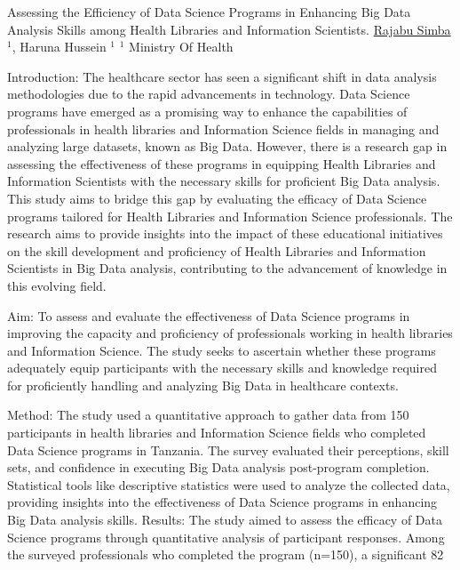 
    \begin{abstract_online}{Assessing the Efficiency of Data Science Programs in Enhancing Big Data Analysis Skills among Health Libraries and Information Scientists.}{%
    \underline{Rajabu Simba}$^{1}$, Haruna Hussein $^{1}$}{%
    }{%
    $^1$ Ministry Of Health\newline{}
    }

Introduction: The healthcare sector has seen a significant shift in data analysis methodologies due to the rapid advancements in technology. Data Science programs have emerged as a promising way to enhance the capabilities of professionals in health libraries and Information Science fields in managing and analyzing large datasets, known as Big Data. However, there is a research gap in assessing the effectiveness of these programs in equipping Health Libraries and Information Scientists with the necessary skills for proficient Big Data analysis. This study aims to bridge this gap by evaluating the efficacy of Data Science programs tailored for Health Libraries and Information Science professionals. The research aims to provide insights into the impact of these educational initiatives on the skill development and proficiency of Health Libraries and Information Scientists in Big Data analysis, contributing to the advancement of knowledge in this evolving field.

Aim: To assess and evaluate the effectiveness of Data Science programs in improving the capacity and proficiency of professionals working in health libraries and Information Science. The study seeks to ascertain whether these programs adequately equip participants with the necessary skills and knowledge required for proficiently handling and analyzing Big Data in healthcare contexts.

Method: The study used a quantitative approach to gather data from 150 participants in health libraries and Information Science fields who completed Data Science programs in Tanzania. The survey evaluated their perceptions, skill sets, and confidence in executing Big Data analysis post-program completion. Statistical tools like descriptive statistics were used to analyze the collected data, providing insights into the effectiveness of Data Science programs in enhancing Big Data analysis skills. Results: The study aimed to assess the efficacy of Data Science programs through quantitative analysis of participant responses. Among the surveyed professionals who completed the program (n=150), a significant 82%


\end{abstract_online}
